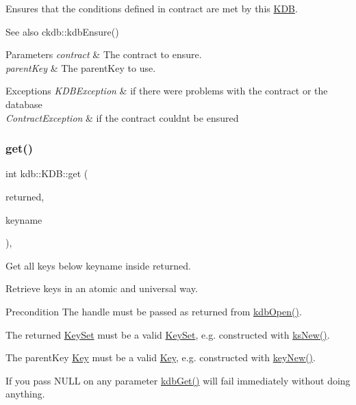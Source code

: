 Ensures that the conditions defined in {\ttfamily contract} are met by this \hyperlink{classkdb_1_1KDB}{K\+DB}. 

\begin{DoxySeeAlso}{See also}
ckdb\+::kdb\+Ensure()
\end{DoxySeeAlso}

\begin{DoxyParams}{Parameters}
{\em contract} & The contract to ensure. \\
\hline
{\em parent\+Key} & The parent\+Key to use.\\
\hline
\end{DoxyParams}

\begin{DoxyExceptions}{Exceptions}
{\em K\+D\+B\+Exception} & if there were problems with the contract or the database \\
\hline
{\em Contract\+Exception} & if the contract couldn\textquotesingle{}t be ensured \\
\hline
\end{DoxyExceptions}
\mbox{\label{classkdb_1_1KDB_a0419ffbc273c89756bc523b4223ec25a}} 
\subsubsection{\texorpdfstring{get()}{get()}\hspace{0.1cm}{\footnotesize\ttfamily [1/2]}}
{\footnotesize\ttfamily int kdb\+::\+K\+D\+B\+::get (\begin{DoxyParamCaption}\item[{\hyperlink{classkdb_1_1KeySet}{Key\+Set} \&}]{returned,  }\item[{std\+::string const \&}]{keyname }\end{DoxyParamCaption})\hspace{0.3cm}{\ttfamily [inline]}, {\ttfamily [virtual]}}



Get all keys below keyname inside returned. 

Retrieve keys in an atomic and universal way. \begin{DoxyPrecond}{Precondition}
The {\ttfamily handle} must be passed as returned from \hyperlink{group__kdb_ga6808defe5870f328dd17910aacbdc6ca}{kdb\+Open()}.

The {\ttfamily returned} \hyperlink{classkdb_1_1KeySet}{Key\+Set} must be a valid \hyperlink{classkdb_1_1KeySet}{Key\+Set}, e.\+g. constructed with \hyperlink{group__keyset_ga671e1aaee3ae9dc13b4834a4ddbd2c3c}{ks\+New()}.

The {\ttfamily parent\+Key} \hyperlink{classkdb_1_1Key}{Key} must be a valid \hyperlink{classkdb_1_1Key}{Key}, e.\+g. constructed with \hyperlink{group__key_gad23c65b44bf48d773759e1f9a4d43b89}{key\+New()}.
\end{DoxyPrecond}
If you pass N\+U\+LL on any parameter \hyperlink{group__kdb_ga28e385fd9cb7ccfe0b2f1ed2f62453a1}{kdb\+Get()} will fail immediately without doing anything.

